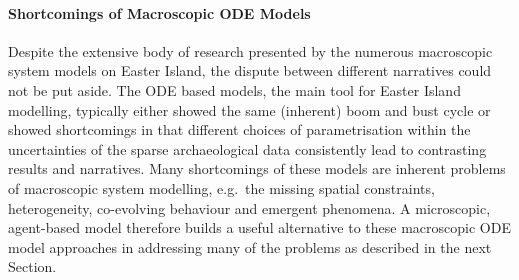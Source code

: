 \paragraph{Shortcomings of Macroscopic ODE Models}
Despite the extensive body of research presented by the numerous macroscopic system models on Easter Island, the dispute between different narratives could not be put aside.
The ODE based models, the main tool for Easter Island modelling, typically either showed the same (inherent) boom and bust cycle or showed shortcomings in that different choices of parametrisation within the uncertainties of the sparse archaeological data consistently lead to contrasting results and narratives.
Many shortcomings of these models are inherent problems of macroscopic system modelling, e.g.\ the missing spatial constraints, heterogeneity, co-evolving behaviour and emergent phenomena.
A microscopic, agent-based model therefore builds a useful alternative to these macroscopic ODE model approaches in addressing many of the problems as described in the next Section.


\FloatBarrier
